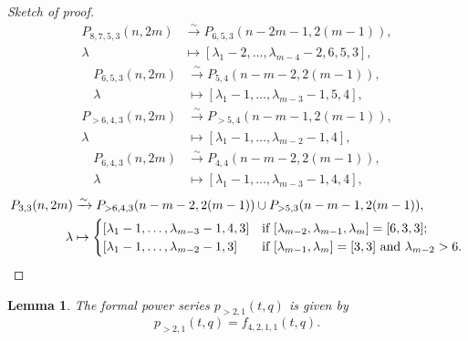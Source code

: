 \documentclass[a4paper, 12pt, reqno]{amsart}
\newtheorem{lemma}[theorem]{Lemma}
\theoremstyle{remark}
\begin{document}
\begin{proof}[Sketch of proof]
\begin{align*}
    P_{8, 7, 5, 3}(n, 2m) &\xrightarrow{\sim} P_{6, 5, 3}(n - 2m - 1, 2(m - 1)), \\
    \lambda &\mapsto [\lambda_1 - 2, \dots, \lambda_{m - 4} - 2, 6, 5, 3],
  \end{align*}
  \begin{align*}
    P_{6, 5, 3}(n, 2m) &\xrightarrow{\sim} P_{5, 4}(n - m - 2, 2(m - 1)), \\
    \lambda &\mapsto [\lambda_1 - 1, \dots, \lambda_{m - 3} - 1, 5, 4],
  \end{align*}
  \begin{align*}
    P_{>6, 4, 3}(n, 2m) &\xrightarrow{\sim} P_{>5, 4}(n - m - 1, 2(m - 1)), \\
    \lambda &\mapsto [\lambda_1 - 1, \dots, \lambda_{m - 2} - 1, 4],
  \end{align*}
  \begin{align*}
    P_{6, 4, 3}(n, 2m) &\xrightarrow{\sim} P_{4, 4}(n - m - 2, 2(m - 1)), \\
    \lambda &\mapsto [\lambda_1 - 1, \dots, \lambda_{m - 3} - 1, 4, 4],
  \end{align*}
  \begin{align*}
    P_{3, 3}(n, 2m) &\xrightarrow{\sim} P_{>6, 4, 3}(n - m - 2, 2(m - 1)) \cup P_{>5, 3}(n - m - 1, 2(m - 1)), \\
    \lambda &\mapsto
              \begin{cases}
                [\lambda_1 - 1, \dots, \lambda_{m - 3} - 1, 4, 3] &\text{if $[\lambda_{m - 2}, \lambda_{m - 1}, \lambda_m] = [6, 3, 3]$}; \\
                [\lambda_1 - 1, \dots, \lambda_{m - 2} - 1, 3] &\text{if $[\lambda_{m - 1}, \lambda_m] = [3, 3]$ and $\lambda_{m - 2} > 6$}. \qedhere
              \end{cases}
  \end{align*}
\end{proof}

\begin{lemma}
  \label{lmm:42}
  The formal power series $p_{>2, 1}(t, q)$ is given by
  \begin{equation*}
    p_{>2, 1}(t, q) = f_{4, 2, 1, 1}(t, q).
  \end{equation*}
\end{lemma}
\end{document}
